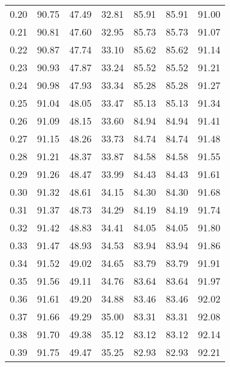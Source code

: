 \begin{tabular}{|c|c|c|c|c|c|c|}
      0.20 &     90.75 &     47.49 &      32.81 &   85.91 &      85.91 &         91.00 \\
      0.21 &     90.81 &     47.60 &      32.95 &   85.73 &      85.73 &         91.07 \\
      0.22 &     90.87 &     47.74 &      33.10 &   85.62 &      85.62 &         91.14 \\
      0.23 &     90.93 &     47.87 &      33.24 &   85.52 &      85.52 &         91.21 \\
      0.24 &     90.98 &     47.93 &      33.34 &   85.28 &      85.28 &         91.27 \\
      0.25 &     91.04 &     48.05 &      33.47 &   85.13 &      85.13 &         91.34 \\
      0.26 &     91.09 &     48.15 &      33.60 &   84.94 &      84.94 &         91.41 \\
      0.27 &     91.15 &     48.26 &      33.73 &   84.74 &      84.74 &         91.48 \\
      0.28 &     91.21 &     48.37 &      33.87 &   84.58 &      84.58 &         91.55 \\
      0.29 &     91.26 &     48.47 &      33.99 &   84.43 &      84.43 &         91.61 \\
      0.30 &     91.32 &     48.61 &      34.15 &   84.30 &      84.30 &         91.68 \\
      0.31 &     91.37 &     48.73 &      34.29 &   84.19 &      84.19 &         91.74 \\
      0.32 &     91.42 &     48.83 &      34.41 &   84.05 &      84.05 &         91.80 \\
      0.33 &     91.47 &     48.93 &      34.53 &   83.94 &      83.94 &         91.86 \\
      0.34 &     91.52 &     49.02 &      34.65 &   83.79 &      83.79 &         91.91 \\
      0.35 &     91.56 &     49.11 &      34.76 &   83.64 &      83.64 &         91.97 \\
      0.36 &     91.61 &     49.20 &      34.88 &   83.46 &      83.46 &         92.02 \\
      0.37 &     91.66 &     49.29 &      35.00 &   83.31 &      83.31 &         92.08 \\
      0.38 &     91.70 &     49.38 &      35.12 &   83.12 &      83.12 &         92.14 \\
      0.39 &     91.75 &     49.47 &      35.25 &   82.93 &      82.93 &         92.21 \\

\end{tabular}
